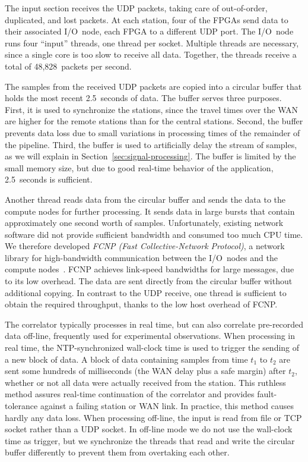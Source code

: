 \documentclass{sig-alternate}
\begin{document}
The input section receives the UDP packets, taking care of out-of-order,
duplicated, and lost packets.
At each station, four of the FPGAs send data to their associated I/O~node,
each FPGA to a different UDP port.
The I/O~node runs four ``input'' threads, one thread per socket.
Multiple threads are necessary, since a single core is too slow to receive all
data.
Together, the threads receive a total of 48,828~packets per second.

The samples from the received UDP packets are copied into a circular buffer that
holds the most recent 2.5~seconds of data.
The buffer serves three purposes.
First, it is used to synchronize the stations, since the travel times over
the WAN are higher for the remote stations than for the central stations.
Second, the buffer prevents data loss due to small variations in processing
times of the remainder of the pipeline.
Third, the buffer is used to artificially delay the stream of samples,
as we will explain in Section~\ref{sec:signal-processing}.
The buffer is limited by the small memory size, but due to good real-time
behavior of the application, 2.5~seconds is sufficient.

Another thread reads data from the circular buffer and sends the data to
the compute nodes for further processing. 
It sends data in large bursts that contain approximately one second worth of samples.
Unfortunately, existing network software did not provide sufficient bandwidth
and consumed too much CPU time.
We therefore developed \emph{FCNP (Fast Collective-Network Protocol)}, a 
network library for high-bandwidth communication between the I/O~nodes and the
compute nodes~\cite{Romein:09a}.
FCNP achieves link-speed bandwidths for large messages, due to
its low overhead.
The data are sent directly from the circular buffer without additional copying.
In contrast to the UDP receive, one thread is sufficient to obtain the
required throughput, thanks to the low host overhead of FCNP.

The correlator typically processes in real time, but can also correlate
pre-recorded data off-line, frequently used for experimental observations.
When processing in real time, the NTP-synchronized wall-clock time
is used to trigger the sending of a new block of data.
A block of data containing samples from time $t_1$ to $t_2$ are sent some 
hundreds of milliseconds (the WAN delay plus a safe margin) after $t_2$,
whether or not all data were actually received from the station.
This ruthless method assures real-time continuation of the correlator and
provides fault-tolerance against a failing station or WAN link.
In practice, this method causes hardly any data loss.
When processing off-line, the input is read from file or TCP socket rather
than a UDP socket.
In off-line mode we do not use the wall-clock time as
trigger, but we synchronize the threads that read and write the circular
buffer differently to prevent them from overtaking each other.
\end{document}
